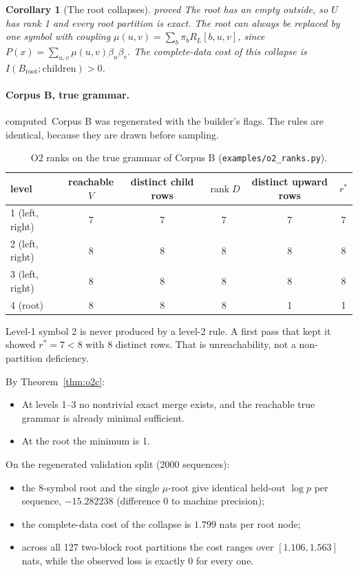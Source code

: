 \documentclass[11pt]{article}
\newtheorem{corollary}[theorem]{Corollary}
\theoremstyle{definition}
\theoremstyle{remark}
\newcommand{\st}[1]{\textsf{\small\color{gray}#1}}
\begin{document}
\begin{corollary}[The root collapses]\label{res:auto26}\st{proved}
The root has an empty outside, so $U$ has rank 1 and every root partition is exact. The root can always be replaced by one symbol with coupling $\mu(u,v)=\sum_b\pi_bR_L[b,u,v]$, since $P(x)=\sum_{u,v}\mu(u,v)\beta_u\beta_v$. The complete-data cost of this collapse is $I(B_{\mathrm{root}};\text{children})>0$.
\end{corollary}

\paragraph{Corpus B, true grammar.}\st{computed}\ Corpus B was regenerated with the builder's flags. The rules are identical, because they are drawn before sampling.
\begin{table}[!htbp]\centering\small
\begin{tabular}{lccccc}
\toprule
level & reachable $V$ & distinct child rows & $\operatorname{rank}D$ & distinct upward rows & $r^*$\\
\midrule
1 (left, right) & 7 & 7 & 7 & 7 & 7\\
2 (left, right) & 8 & 8 & 8 & 8 & 8\\
3 (left, right) & 8 & 8 & 8 & 8 & 8\\
4 (root) & 8 & 8 & 8 & 1 & 1\\
\bottomrule
\end{tabular}
\caption{O2 ranks on the true grammar of Corpus B (\texttt{examples/o2\_ranks.py}).}
\end{table}

\noindent Level-1 symbol 2 is never produced by a level-2 rule. A first pass that kept it showed $r^*=7<8$ with 8 distinct rows. That is unreachability, not a non-partition deficiency.

By Theorem~\ref{thm:o2c}:
\begin{itemize}
  \item At levels 1--3 no nontrivial exact merge exists, and the reachable true grammar is already minimal sufficient.
  \item At the root the minimum is 1.
\end{itemize}

\noindent On the regenerated validation split (2000 sequences):
\begin{itemize}
  \item the 8-symbol root and the single $\mu$-root give identical held-out $\log p$ per sequence, $-15.282238$ (difference $0$ to machine precision);
  \item the complete-data cost of the collapse is $1.799$ nats per root node;
  \item across all 127 two-block root partitions the cost ranges over $[1.106,1.563]$ nats, while the observed loss is exactly $0$ for every one.
\end{itemize}
\end{document}
